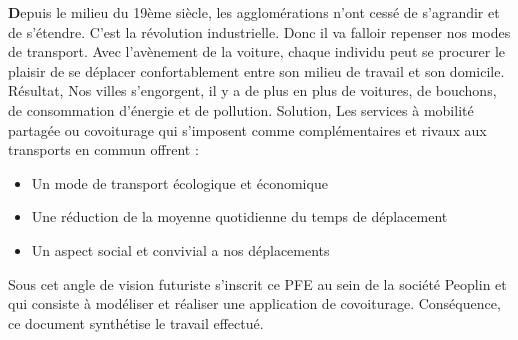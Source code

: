 
\begin{general}

\textbf{D}epuis le milieu du 19ème siècle, les agglomérations n’ont cessé de s’agrandir et de s’étendre. C’est la révolution industrielle. Donc il va falloir repenser nos modes de transport.\newline
Avec l’avènement de la voiture, chaque individu peut se procurer le plaisir de se déplacer confortablement entre son milieu de travail et son domicile.\newline
Résultat, Nos villes s’engorgent, il y a de plus en plus de voitures, de bouchons, de consommation d’énergie et de pollution.\newline
Solution, Les services à mobilité partagée ou covoiturage qui s’imposent comme complémentaires et rivaux aux transports en commun offrent :
\begin{itemize}
\item Un mode de transport écologique et économique
\item Une réduction de la moyenne quotidienne du temps de déplacement
\item Un aspect social et convivial a nos déplacements
\end{itemize}
Sous cet angle de vision futuriste s’inscrit ce PFE au sein de la société Peoplin et qui consiste à modéliser et réaliser une application de covoiturage.\newline
Conséquence, ce document synthétise le travail effectué.

\end{general}
